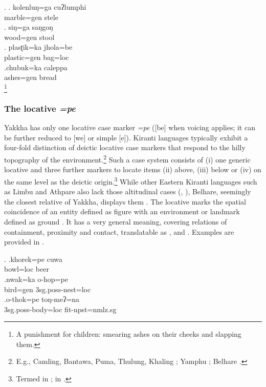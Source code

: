 \ex. \ag. kolenluŋ=ga   cuʔlumphi\\
	marble{\sc =gen} stele\\
	 
 	\bg. siŋ=ga    saŋgoŋ\\
	wood{\sc =gen} stool	\\
\bg. plasʈik=ka    jhola=be\\
plastic{\sc =gen} bag{\sc =loc}\\
	 
	  \bg.chubuk=ka caleppa\\
	  ashes{\sc =gen} bread\\
	  \footnote{A punishment for children: smearing ashes on their cheeks and slapping them.}   


\subsubsection{The locative \emph{=pe}}\label{case-loc}

Yakkha has only one locative case marker \emph{=pe} ([be] when voicing applies; it can be further reduced to [we] or simple [e]). Kiranti languages typically exhibit a four-fold distinction of deictic locative case markers that respond to the hilly topography of the environment.\footnote{E.g., Camling, Bantawa, Puma, Thulung, Khaling \citep{Ebert1994The-structure}; Yamphu \citep[72]{Rutgers1998Yamphu}; Belhare \citep[226]{Bickel2001Deictic}.} Such a case system consists of (i) one generic locative and three further markers to locate items (ii) above, (iii) below or (iv) on the same level as the deictic origin.\footnote{Termed  in \citet[94]{Ebert1994The-structure};  in \citet[62]{Dirksmeyer2008Spatial}.} While other Eastern Kiranti languages such as Limbu and Athpare also lack those altitudinal cases (\citealt[118]{Ebert1997A-grammar}, \citealt[49]{Driem1987A-grammar}), Belhare, seemingly the closest relative of Yakkha, displays them \citep[226]{Bickel2001Deictic}. 
The locative marks the spatial coincidence of an entity defined as {\sc figure} with an environment or landmark defined as {\sc ground}  \citep[3]{Levinsonetal2006_Grammars}.  It has a very general meaning, covering relations of containment, proximity and contact, translatable as ,  and . Examples are provided in \Next. 

\ex. \ag.khorek=pe cuwa\\
		bowl{\sc =loc} beer	\\
	 \bg.nwak=ka o-hop=pe\\
		bird{\sc =gen} {\sc 3sg.poss}-nest{\sc =loc}	\\
		\bg.o-thok=pe toŋ-meʔ=na\\
		{\sc 3sg.poss}-body{\sc =loc} fit{\sc [3sg]-npst=nmlz.sg}\\
	
